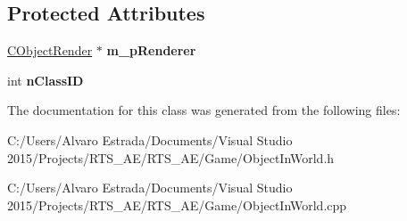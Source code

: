 \subsection*{Protected Attributes}
\begin{DoxyCompactItemize}
\item 
\hyperlink{class_c_object_render}{C\+Object\+Render} $\ast$ {\bfseries m\+\_\+p\+Renderer}\hypertarget{class_c_object_in_world_a6f0f01ef5e538abf5eca9a1c570578ba}{}\label{class_c_object_in_world_a6f0f01ef5e538abf5eca9a1c570578ba}

\item 
int {\bfseries n\+Class\+ID}\hypertarget{class_c_object_in_world_a25dc6ba056cda5f471cf7a0b03c346c0}{}\label{class_c_object_in_world_a25dc6ba056cda5f471cf7a0b03c346c0}

\end{DoxyCompactItemize}


The documentation for this class was generated from the following files\+:\begin{DoxyCompactItemize}
\item 
C\+:/\+Users/\+Alvaro Estrada/\+Documents/\+Visual Studio 2015/\+Projects/\+R\+T\+S\+\_\+\+A\+E/\+R\+T\+S\+\_\+\+A\+E/\+Game/Object\+In\+World.\+h\item 
C\+:/\+Users/\+Alvaro Estrada/\+Documents/\+Visual Studio 2015/\+Projects/\+R\+T\+S\+\_\+\+A\+E/\+R\+T\+S\+\_\+\+A\+E/\+Game/Object\+In\+World.\+cpp\end{DoxyCompactItemize}
